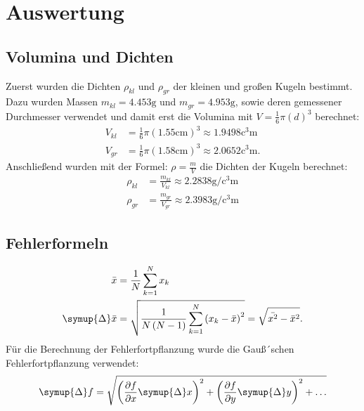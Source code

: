 \section{Auswertung}
\label{sec:Auswertung}
\subsection{Volumina und Dichten}
Zuerst wurden die Dichten $\rho_{kl}$ und $\rho_{gr}$ der kleinen und großen Kugeln bestimmt. Dazu wurden Massen
$m_{kl} = 4.453\unit{\gram}$ und $m_{gr} = 4.953 \unit{\gram}$, sowie deren gemessener Durchmesser verwendet und
damit erst die Volumina mit $V = \frac{1}{6}\pi\left(d\right)^3$ berechnet:
\begin{align*}
  V_{kl} &= \frac{1}{6}\pi\left(1.55\unit{\centi\meter}\right)^3 \approx 1.9498\unit{\cubic\centi\meter}\\
  V_{gr} &= \frac{1}{6}\pi\left(1.58\unit{\centi\meter}\right)^3 \approx 2.0652\unit{\cubic\centi\meter}.
\end{align*}
Anschließend wurden mit der Formel: $\rho = \frac{m}{V}$ die Dichten der Kugeln berechnet:
\begin{align*}
  \rho_{kl} &= \frac{m_{kl}}{V_{kl}} \approx 2.2838\unit{\gram\per\cubic\centi\meter}\\
  \rho_{gr} &= \frac{m_{gr}}{V_{gr}} \approx 2.3983\unit{\gram\per\cubic\centi\meter}
\end{align*}
\subsection{Fehlerformeln}
\begin{align*}
  \bar{x} &= \frac{1}{N}\sum_{k=1}^{N} x_k\\
  \symup{\Delta}\bar{x} &= \sqrt{\frac{1}{N\left(N-1\right)}\sum_{k=1}^{N}\left(x_k-\bar{x}\right)^2} = \sqrt{\bar{x^2}-\bar{x}^2}.
\end{align*}
Für die Berechnung der Fehlerfortpflanzung wurde die Gauß´schen Fehlerfortpflanzung verwendet:
\begin{equation*}
  \symup{\Delta}f = \sqrt{\left(\frac{\partial f}{\partial x}\symup{\Delta}x\right)^2 + \left(\frac{\partial f}{\partial y}\symup{\Delta}y\right)^2 +\ldots}
\end{equation*}
